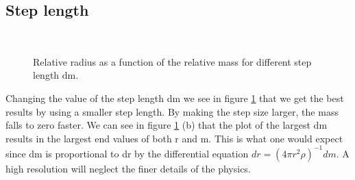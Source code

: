 \documentclass[a4paper,10pt]{article}
\begin{document}
\subsection{Step length}
\begin{figure}[!]
\centering
{} \\
\caption{Relative radius as a function of the relative mass for different step length dm.}
\label{fig:dm_test}
\end{figure}

Changing the value of the step length dm we see in figure \ref{fig:dm_test} that we get the best results by using a smaller step length. By making the step size larger, the mass falls to zero faster. We can see in figure \ref{fig:dm_test} (b) that the plot of the largest dm 
results in the largest end values of both r and m. This is what one would expect since dm is proportional to dr by the differential equation $dr = (4\pi r^2 \rho)^{-1}dm$. A high resolution will neglect the finer details of the physics.
\end{document}
